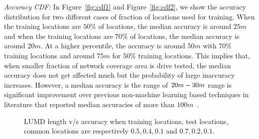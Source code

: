 \documentclass[conference, 10pt]{IEEEtran}
\begin{document}
{\em Accuracy CDF:} In Figure~\ref{fig:cdf1} and Figure~\ref{fig:cdf2}, we show the
accuracy distribution for two different cases of fraction of locations used for
training. When the training locations are $50\%$ of locations, the median accuracy is around
$25m$ and when the training locations are $70\%$ of locations, the median accuracy is
around $20m$. At a higher percentile, the accuracy is around $50m$ with $70\%$
training locations and around $75m$ for $50\%$ training locations. This implies that,
when smaller fraction of network coverage area is drive tested, the median accuracy
does not get affected much but the probability of large inaccuracy increases.
However, a median accuracy is the range of $20m\--30m$ range is significant
improvement over previous non-machine learning based techniques in literature that
reported median accuracies of more than $100m$~\cite{Flananghan07PCMD}.


\begin{figure}[t]
\begin{center}
\caption{LUMD length v/s accuracy
when training locations, test
locations, common locations are respectively $0.5,0.4,0.1$ and $0.7,0.2,0.1$.}
\end{center}
\end{figure}
\end{document}
